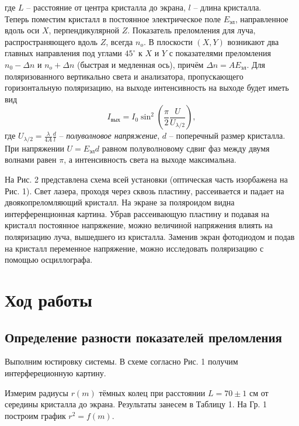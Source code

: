 \documentclass[a4paper,12pt]{article} %
\begin{document}
где $L$ -- расстояние от центра кристалла до экрана, $l$ -- длина кристалла.\\
Теперь поместим кристалл в постоянное электрическое поле $E_{\text{эл}}$, направленное вдоль оси $X$, перпендикулярной $Z$. Показатель преломления для луча, распространяющего вдоль $Z$, всегда $n_o$. В плоскости $(X,Y)$ возникают два главных направления под углами $45^\circ$ к $X$ и $Y$ с показателями преломления $n_0 - \Delta n$ и $n_o + \Delta n$ (быстрая и медленная ось), причём $\Delta n = A E_{\text{эл}}$. Для поляризованного вертикально света и анализатора, пропускающего горизонтальную поляризацию, на выходе интенсивность на выходе будет иметь вид
\begin{equation}
I_{\text{вых}} = I_0 \sin^2 \left(\dfrac{\pi}{2} \dfrac{U}{U_{\lambda/2}} \right),
\end{equation}
где $U_{\lambda/2} = \frac{\lambda}{4A}\frac{d}{l}$ -- \textit{полуволновое напряжение}, $d$ -- поперечный размер кристалла.  При напряжении $U = E_{\text{эл}}d$ равном полуволновому сдвиг фаз между двумя волнами равен $\pi$, а интенсивность света на выходе максимальна. 


На Рис. 2 представлена схема всей установки (оптическая часть изорбажена на Рис. 1). Свет лазера, проходя через сквозь пластину, рассеивается и падает на двоякопреломляющий кристалл. На экране за поляроидом видна интерференционная картина. Убрав рассеивающую пластину и подавая на кристалл постоянное напряжение, можно величиной напряжения влиять на поляризацию луча, вышедшего из кристалла. Заменив экран фотодиодом и подав на кристалл переменное напряжение, можно исследовать поляризацию с помощью осциллографа.

\section*{Ход работы}
\subsection*{Определение разности показателей преломления}

\par Выполним юстировку системы. В схеме согласно Рис. 1 получим интерфереционную картину. 

\par Измерим радиусы $r(m)$ тёмных колец при расстоянии $L = 70 \pm 1 \text{ см}$ от середины кристалла до экрана. Результаты занесем в Таблицу 1. На Гр. 1 построим график $r^2 = f(m)$.
\end{document}
